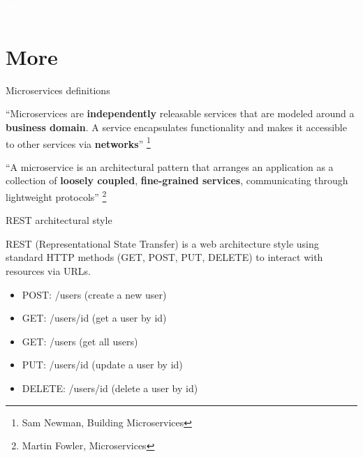 \documentclass{beamer}
\begin{document}
\begin{frame}{}
	\begin{center}
		\Huge{\textcolor{white}{Thank you for your attention!}}
	\end{center}
\end{frame}

\section{More}
\begin{frame}{Microservices definitions}
	\label{microservices_definitions}
	\begin{block}{}
		“Microservices are \textbf{independently} releasable services that are modeled around a \textbf{business domain}. A service encapsulates functionality and makes it accessible to other services via \textbf{networks}” \footnote{Sam Newman, Building Microservices}
	\end{block}
	\begin{block}{}
		“A microservice is an architectural pattern that arranges an application as a collection of \textbf{loosely coupled}, \textbf{fine-grained services}, communicating through lightweight protocols” \footnote{Martin Fowler, Microservices}
	\end{block}

\hyperlink{index_1}{}
\end{frame}

\begin{frame}{REST architectural style}
	\begin{block}{}
		REST (Representational State Transfer) is a web architecture style using standard HTTP methods (GET, POST, PUT, DELETE) to interact with resources via URLs.
	\end{block}
	\begin{itemize}
		\item POST: /users (create a new user)
		\item GET: /users/{id} (get a user by id)
		\item GET: /users (get all users)
		\item PUT: /users/{id} (update a user by id)
		\item DELETE: /users/{id} (delete a user by id)
	\end{itemize}
	
	\label{rest}
\hyperlink{index_1}{}
\end{frame}
\end{document}
